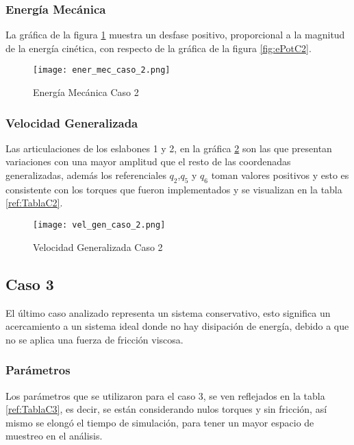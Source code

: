     \subsubsection{Energía Mecánica}
    La gráfica de la figura \ref{fig:eMecC2} muestra un desfase positivo, proporcional a la magnitud de la energía cinética, con respecto de la gráfica de la figura \ref{fig:ePotC2}.
    \begin{figure} [H]%
            \centering
            \texttt{[image: ener\_mec\_caso\_2.png]} 
        \caption{Energía Mecánica Caso 2}
        \label{fig:eMecC2}
    \end{figure}

    \subsubsection{Velocidad Generalizada}
    Las articulaciones de los eslabones 1 y 2, en la gráfica \ref{fig:VelGenC2} son las que presentan variaciones con una mayor amplitud que el resto de las coordenadas generalizadas, además los referenciales $q_2$,$q_5$ y $q_6$ toman valores positivos y esto es consistente con los torques que fueron implementados y se visualizan en la tabla \ref{ref:TablaC2}.
    \begin{figure}[H]%
            \centering
            \texttt{[image: vel\_gen\_caso\_2.png]} 
        \caption{Velocidad Generalizada Caso 2}
        \label{fig:VelGenC2}
    \end{figure}

\subsection{Caso 3}\label{caso3}
    El último caso analizado representa un sistema conservativo, esto significa un acercamiento a un sistema ideal donde no hay disipación de energía, debido a que no se aplica una fuerza de fricción viscosa.

    \subsubsection{Parámetros}

    Los parámetros que se utilizaron para el caso 3, se ven reflejados en la tabla \ref{ref:TablaC3}, es decir, se están considerando nulos torques y sin fricción, así mismo se elongó el tiempo de simulación, para tener un mayor espacio de muestreo en el análisis.

